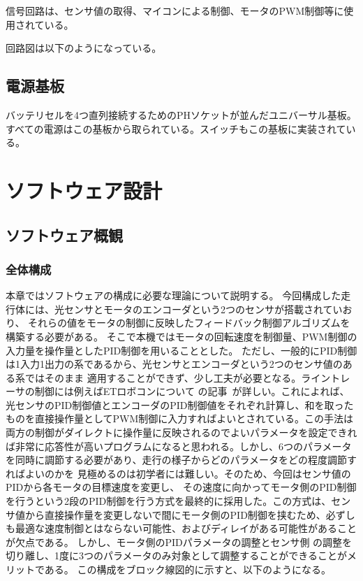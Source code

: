 \documentclass{ltjsreport}
\begin{document}
信号回路は、センサ値の取得、マイコンによる制御、モータのPWM制御等に使用されている。

回路図は以下のようになっている。

\section{電源基板}
バッテリセルを4つ直列接続するためのPHソケットが並んだユニバーサル基板。すべての電源はこの基板から取られている。スイッチもこの基板に実装されている。










\chapter{ソフトウェア設計}
\section{ソフトウェア概観}
\subsection{全体構成}
本章ではソフトウェアの構成に必要な理論について説明する。
今回構成した走行体には、光センサとモータのエンコーダという2つのセンサが搭載されていおり、
それらの値をモータの制御に反映したフィードバック制御アルゴリズムを構築する必要がある。
そこで本機ではモータの回転速度を制御量、PWM制御の入力量を操作量としたPID制御を用いることとした。
ただし、一般的にPID制御は1入力1出力の系であるから、光センサとエンコーダという2つのセンサ値のある系ではそのまま
適用することができず、少し工夫が必要となる。ライントレーサの制御には例えばETロボコンについて
の記事~\cite{ETM}が詳しい。これによれば、光センサのPID制御値とエンコーダのPID制御値をそれぞれ計算し、和を取ったものを直接操作量としてPWM制御に入力すればよいとされている。この手法は両方の制御がダイレクトに操作量に反映されるのでよいパラメータを設定できれば非常に応答性が高いプログラムになると思われる。しかし、6つのパラメータを同時に調節する必要があり、走行の様子からどのパラメータをどの程度調節すればよいのかを
見極めるのは初学者には難しい。そのため、今回はセンサ値のPIDから各モータの目標速度を変更し、
その速度に向かってモータ側のPID制御を行うという2段のPID制御を行う方式を最終的に採用した。この方式は、センサ値から直接操作量を変更しないで間にモータ側のPID制御を挟むため、必ずしも最適な速度制御とはならない可能性、およびディレイがある可能性があることが欠点である。
しかし、モータ側のPIDパラメータの調整とセンサ側
の調整を切り離し、1度に3つのパラメータのみ対象として調整することができることがメリットである。
この構成をブロック線図的に示すと、以下のようになる。
\end{document}
